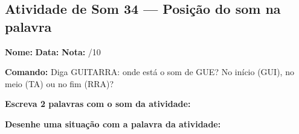 \subsection{Atividade de Som 34 --- Posição do som na palavra}
\begin{exercicio}



\noindent\textbf{Nome:} \underline{\hspace{3.2cm}} \quad \textbf{Data:} \underline{\hspace{1.6cm}} \quad \textbf{Nota:} \underline{\hspace{0.9cm}}/10


\noindent\textbf{Comando:} Diga GUITARRA: onde está o som de GUE? No início (GUI), no meio (TA) ou no fim (RRA)?


\begin{center}
\end{center}

\noindent\textbf{Escreva 2 palavras com o som da atividade:}

\begin{center}
  \underline{\hspace{3cm}} \quad \underline{\hspace{3cm}}
\end{center}

\noindent\textbf{Desenhe uma situação com a palavra da atividade:}

\begin{center}
\end{center}

\end{exercicio}




